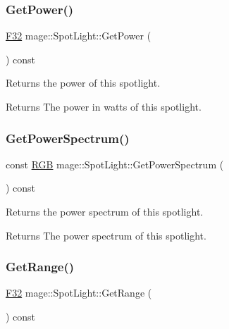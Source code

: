 \subsubsection{\texorpdfstring{Get\+Power()}{GetPower()}}
{\footnotesize\ttfamily \hyperlink{namespacemage_aa97e833b45f06d60a0a9c4fc22ae02c0}{F32} mage\+::\+Spot\+Light\+::\+Get\+Power (\begin{DoxyParamCaption}{ }\end{DoxyParamCaption}) const\hspace{0.3cm}{\ttfamily [noexcept]}}

Returns the power of this spotlight.

\begin{DoxyReturn}{Returns}
The power in watts of this spotlight. 
\end{DoxyReturn}
\hypertarget{classmage_1_1_spot_light_a2c9926f4332198ef4183f7958e9a5644}{}\label{classmage_1_1_spot_light_a2c9926f4332198ef4183f7958e9a5644} 
\subsubsection{\texorpdfstring{Get\+Power\+Spectrum()}{GetPowerSpectrum()}}
{\footnotesize\ttfamily const \hyperlink{structmage_1_1_r_g_b}{R\+GB} mage\+::\+Spot\+Light\+::\+Get\+Power\+Spectrum (\begin{DoxyParamCaption}{ }\end{DoxyParamCaption}) const\hspace{0.3cm}{\ttfamily [noexcept]}}

Returns the power spectrum of this spotlight.

\begin{DoxyReturn}{Returns}
The power spectrum of this spotlight. 
\end{DoxyReturn}
\hypertarget{classmage_1_1_spot_light_a19baba95ca8c5f5f6147ab0a03e6b64a}{}\label{classmage_1_1_spot_light_a19baba95ca8c5f5f6147ab0a03e6b64a} 
\subsubsection{\texorpdfstring{Get\+Range()}{GetRange()}}
{\footnotesize\ttfamily \hyperlink{namespacemage_aa97e833b45f06d60a0a9c4fc22ae02c0}{F32} mage\+::\+Spot\+Light\+::\+Get\+Range (\begin{DoxyParamCaption}{ }\end{DoxyParamCaption}) const\hspace{0.3cm}{\ttfamily [noexcept]}}

